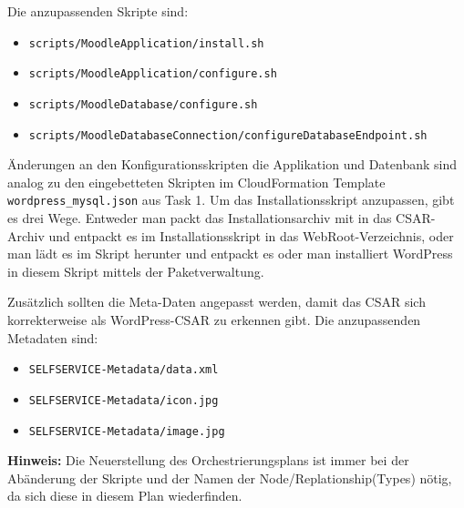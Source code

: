 Die anzupassenden Skripte sind:
\begin{itemize}
    \item \texttt{scripts/MoodleApplication/install.sh}
    \item \texttt{scripts/MoodleApplication/configure.sh}
    \item \texttt{scripts/MoodleDatabase/configure.sh}
    \item \texttt{scripts/MoodleDatabaseConnection/configureDatabaseEndpoint.sh}
\end{itemize}
Änderungen an den Konfigurationsskripten die Applikation und Datenbank sind analog zu den eingebetteten Skripten im CloudFormation Template \texttt{wordpress\_mysql.json} aus Task 1. Um das Installationsskript anzupassen, gibt es drei Wege. Entweder man packt das Installationsarchiv mit in das CSAR-Archiv und entpackt es im Installationsskript in das WebRoot-Verzeichnis, oder man lädt es im Skript herunter und entpackt es oder man installiert WordPress in diesem Skript mittels der Paketverwaltung.

Zusätzlich sollten die Meta-Daten angepasst werden, damit das CSAR sich korrekterweise als WordPress-CSAR zu erkennen gibt. Die anzupassenden Metadaten sind:
\begin{itemize}
    \item \texttt{SELFSERVICE-Metadata/data.xml}
    \item \texttt{SELFSERVICE-Metadata/icon.jpg}
    \item \texttt{SELFSERVICE-Metadata/image.jpg}
\end{itemize}

\textbf{Hinweis:} Die Neuerstellung des Orchestrierungsplans ist immer bei der Abänderung der Skripte und der Namen der Node/Replationship(Types) nötig, da sich diese in diesem Plan wiederfinden.
